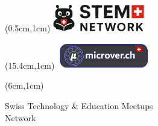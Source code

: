 \documentclass[10pt]{article}
\begin{document}
\begin{textblock*}{5cm}(0.5cm,1cm) %
	\includegraphics[width=4cm]{stem-network.png}
\end{textblock*}

\begin{textblock*}{5cm}(15.4cm,1cm) %
	\includegraphics[width=4cm]{microver.png}
\end{textblock*}

\begin{textblock*}{9cm}(6cm,1cm) %
	\begin{center}
		Swiss Technology \& Education Meetups \\
		Network
	\end{center}
\end{textblock*}

\vspace*{0.3cm}
\end{document}
